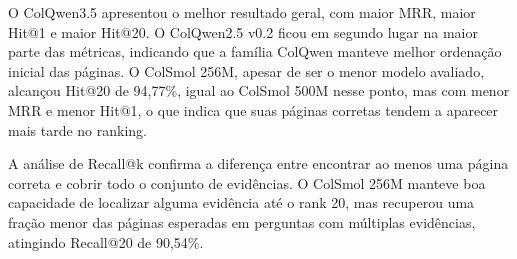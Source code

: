 O ColQwen3.5 apresentou o melhor resultado geral, com maior MRR, maior Hit@1 e maior Hit@20. O ColQwen2.5 v0.2 ficou em segundo lugar na maior parte das métricas, indicando que a família ColQwen manteve melhor ordenação inicial das páginas. O ColSmol 256M, apesar de ser o menor modelo avaliado, alcançou Hit@20 de 94,77\%, igual ao ColSmol 500M nesse ponto, mas com menor MRR e menor Hit@1, o que indica que suas páginas corretas tendem a aparecer mais tarde no ranking.

\begin{table}[htbp]
\centering
\caption{Comparação global entre modelos visuais: MRR e Evidence Page Recall@k.}
\label{tab:comparacao-colvision-recall}
\scriptsize
{}
\end{table}

A análise de Recall@k confirma a diferença entre encontrar ao menos uma página correta e cobrir todo o conjunto de evidências. O ColSmol 256M manteve boa capacidade de localizar alguma evidência até o rank 20, mas recuperou uma fração menor das páginas esperadas em perguntas com múltiplas evidências, atingindo Recall@20 de 90,54\%.

\begin{table}[htbp]
\centering
\caption{Comparação de tempo entre modelos visuais.}
\label{tab:comparacao-colvision-tempo}
\scriptsize
{}
\end{table}

